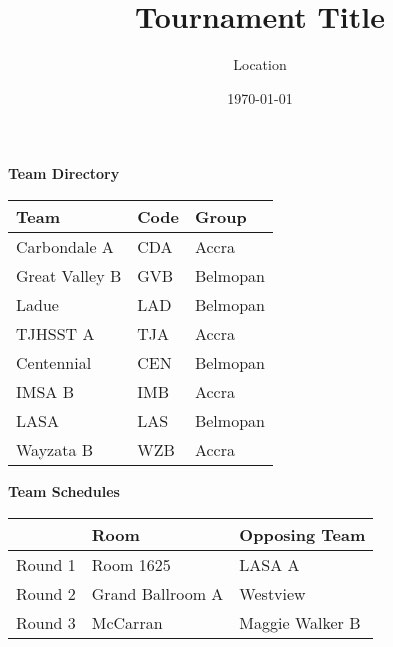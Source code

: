 \documentclass[a4paper,12pt]{report}
\begin{document}

\begin{huge}
\title{Tournament Title}
\author{Location}
\date{\today}
\end{huge}
\maketitle


\pagebreak

\begin{center}
\begin{huge}
\textbf{Team Directory}
\end{huge}

\vspace{36pt}

\begin{tabular}{lll}
    \rowcolor{gray!30}
Team & Code & Group \\
\hline
Carbondale A & CDA & Accra \\
Great Valley B & GVB & Belmopan \\
Ladue & LAD & Belmopan \\
TJHSST A & TJA & Accra \\
Centennial & CEN & Belmopan \\
IMSA B & IMB & Accra \\
LASA & LAS & Belmopan \\
Wayzata B & WZB & Accra \\
\end{tabular}

\end{center}

\pagebreak

\begin{center}
\begin{huge}
\textbf{Team Schedules}
\end{huge}

\vspace{36pt}

\begin{tabular}{l|ll}
& Room & Opposing Team \\
\hline
Round 1 & Room 1625 & LASA A \\
Round 2 & Grand Ballroom A & Westview \\
Round 3 & McCarran & Maggie Walker B \\
\end{tabular}

\end{center}
\end{document}
